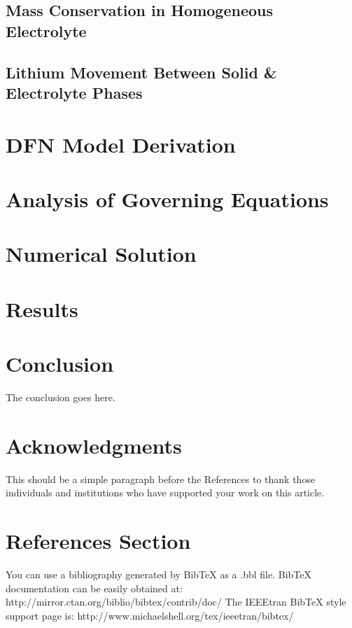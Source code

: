 \documentclass[lettersize,journal]{IEEEtran}
\begin{document}
\subsection{Mass Conservation in Homogeneous Electrolyte}
\subsection{Lithium Movement Between Solid \& Electrolyte Phases}


\section{DFN Model Derivation}



\section{Analysis of Governing Equations}

\section{Numerical Solution}

\section{Results}

\section{Conclusion}
The conclusion goes here.


\section*{Acknowledgments}
This should be a simple paragraph before the References to thank those individuals and institutions who have supported your work on this article.

\section{References Section}
You can use a bibliography generated by BibTeX as a .bbl file.
 BibTeX documentation can be easily obtained at:
 http://mirror.ctan.org/biblio/bibtex/contrib/doc/
 The IEEEtran BibTeX style support page is:
 http://www.michaelshell.org/tex/ieeetran/bibtex/

%
%
\end{document}
